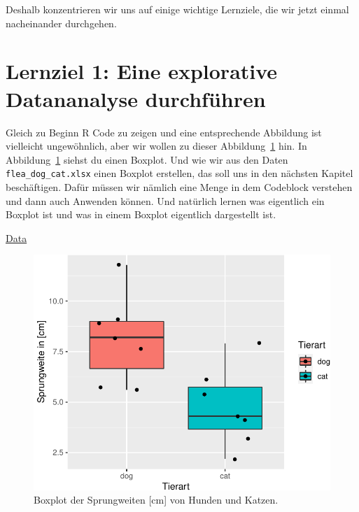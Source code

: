 \documentclass[
  letterpaper,
  DIV=11,
  oneside]{scrreport}
\begin{document}
Deshalb konzentrieren wir uns auf einige wichtige Lernziele, die wir
jetzt einmal nacheinander durchgehen.

\hypertarget{lernziel-1-eine-explorative-datananalyse-durchfuxfchren}{%
\section{Lernziel 1: Eine explorative Datananalyse
durchführen}\label{lernziel-1-eine-explorative-datananalyse-durchfuxfchren}}

Gleich zu Beginn R Code zu zeigen und eine entsprechende Abbildung ist
vielleicht ungewöhnlich, aber wir wollen zu dieser
Abbildung~\ref{fig-boxplot-preface} hin. In
Abbildung~\ref{fig-boxplot-preface} siehst du einen Boxplot. Und wie wir
aus den Daten \texttt{flea\_dog\_cat.xlsx} einen Boxplot erstellen, das
soll uns in den nächsten Kapitel beschäftigen. Dafür müssen wir nämlich
eine Menge in dem Codeblock verstehen und dann auch Anwenden können. Und
natürlich lernen was eigentlich ein Boxplot ist und was in einem Boxplot
eigentlich dargestellt ist.

\href{https://github.com/jkruppa/jkruppa.github.io/blob/master/data/flea_dog_cat.xlsx}{Data}

\begin{figure}

{\centering \includegraphics{./preface_files/figure-pdf/fig-boxplot-preface-1.pdf}

}

\caption{\label{fig-boxplot-preface}Boxplot der Sprungweiten {[}cm{]}
von Hunden und Katzen.}

\end{figure}
\end{document}
